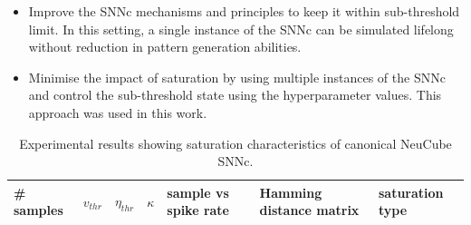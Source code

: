 \begin{itemize}
	\item Improve the SNNc mechanisms and principles to keep it within sub-threshold limit. In this setting, a single instance of the SNNc can be simulated lifelong without reduction in pattern generation abilities.
	\item Minimise the impact of saturation by using multiple instances of the SNNc and control the sub-threshold state using the hyperparameter values. This approach was used in this work.
\end{itemize}          

\begin{table}
	\centering
	\caption{Experimental results showing saturation characteristics of canonical NeuCube SNNc.}
	\label{tab:saturation}
		\begin{tabular}{@{}|l|l|l|l|l|l|l|@{}}
			\toprule \toprule
			\# samples & $v_{thr}$ & $\eta_{thr}$ & $\kappa$ & sample vs spike rate & Hamming distance matrix & saturation type \\ \midrule

\end{tabular}
\end{table}
